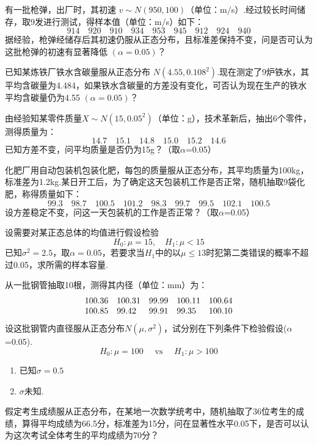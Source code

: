 \begin{xiti}
	\item 有一批枪弹，出厂时，其初速 $v\sim N(950,100)$（单位：m/s）.经过较长时间储存，取9发进行测试，得样本值（单位：m/s）如下：
	\[914 \quad 920 \quad 910 \quad 934 \quad 953 \quad 945 \quad 912 \quad 924 \quad 940\]
	据经验，枪弹经储存后其初速仍服从正态分布，且标准差保持不变，问是否可认为这批枪弹的初速有显著降低 $(\alpha=0.05)$？
		
	\item 已知某炼铁厂铁水含碳量服从正态分布 $N(4.55,0.108^{{2}})$.现在测定了9炉铁水，其平均含碳量为4.484，如果铁水含碳量的方差没有变化，可否认为现在生产的铁水平均含碳量仍为4.55 $(\alpha=0.05)$？
	
	
	\item 由经验知某零件质量$X \sim N \left( 15,0.05 ^ { 2 } \right)$（单位：g），技术革新后，抽出6个零件，测得质量为：
	\[14.7 \quad 15.1 \quad 14.8 \quad 15.0 \quad 15.2 \quad 14.6\]
	已知方差不变，问平均质量是否仍为15g？（取$\alpha$=0.05）
	
	
	\item 化肥厂用自动包装机包装化肥，每包的质量服从正态分布，其平均质量为100kg，标准差为1.2kg.某日开工后，为了确定这天包装机工作是否正常，随机抽取9袋化肥，称得质量如下：
	\[99.3 \quad 98.7 \quad 100.5 \quad 101.2 \quad 98.3 \quad 99.7 \quad 99.5 \quad 102.1 \quad 100.5\]
	设方差稳定不变，问这一天包装机的工作是否正常？（取$\alpha$=0.05）
	
	
	\item 设需要对某正态总体的均值进行假设检验
	\[H _ { 0 } : \mu = 15 , \quad H _ { 1 } : \mu < 15\]
	已知$\sigma^{2}=2.5$，取$\alpha=0.05$，若要求当$H_{1}$中的以$\mu \leq 13$时犯第二类错误的概率不超过0.05，求所需的样本容量.
	
	
	\item 从一批钢管抽取10根，测得其内径（单位：mm）为：
	\[\begin{array} { l l l l l } { 100.36 } & { 100.31 } & { 99.99 } & { 100.11 } & { 100.64 } \\ { 100.85 } & { 99.42 } & { 99.91 } & { 99.35 } & { 100.10 } \end{array}\]
	设这批钢管内直径服从正态分布$N(\mu ,\sigma^{2})$，试分别在下列条件下检验假设($\alpha$=0.05).
	\[H _ { 0 } : \mu = 100 \quad \text { vs } \quad H _ { 1 } : \mu > 100\]
	\begin{enumerate}
		\item 已知$\sigma=0.5$
		\item $\sigma$未知.
	\end{enumerate}
	\item 假定考生成绩服从正态分布，在某地一次数学统考中，随机抽取了36位考生的成绩，算得平均成绩为66.5分，标准差为15分，问在显著性水平0.05下，是否可以认为这次考试全体考生的平均成绩为70分？
	

\end{xiti}
